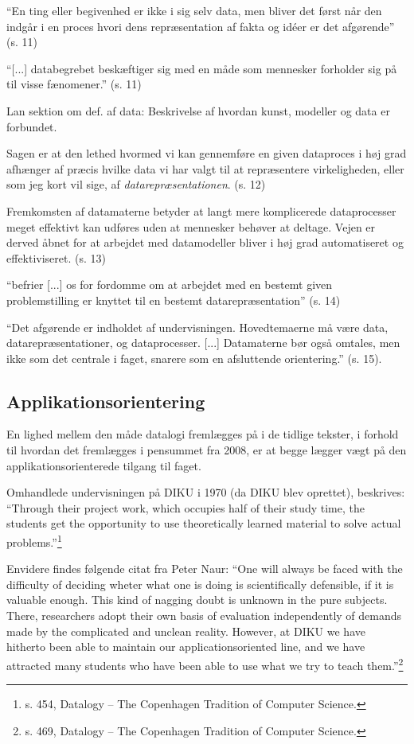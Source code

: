 \documentclass[10pt,a4paper]{article}
\begin{document}
``En ting eller begivenhed er ikke i sig selv data, men bliver det først når den
indgår i en proces hvori dens repræsentation af fakta og idéer er det afgørende''
(s. 11)

``[...] databegrebet beskæftiger sig med en måde som mennesker forholder 
sig på til visse fænomener.'' (s. 11)

Lan sektion om def. af data: Beskrivelse af hvordan kunst, modeller og data er
forbundet. 

Sagen er at den lethed hvormed vi kan gennemføre en given dataproces i høj grad 
afhænger af præcis hvilke data vi har valgt til at repræsentere virkeligheden, 
eller som jeg kort vil sige, af \emph{datarepræsentationen}. 
(s. 12)

Fremkomsten af datamaterne betyder at langt mere komplicerede dataprocesser 
meget effektivt kan udføres uden at mennesker behøver at deltage. Vejen er 
derved åbnet for at arbejdet med datamodeller bliver i høj grad automatiseret og 
effektiviseret. (s. 13)

``befrier [...] os for fordomme om at arbejdet med en bestemt given problemstilling
er knyttet til en bestemt datarepræsentation'' (s. 14)

``Det afgørende er indholdet af undervisningen. Hovedtemaerne må være data, 
datarepræsentationer, og dataprocesser. [...] Datamaterne bør også omtales, men
ikke som det centrale i faget, snarere som en afsluttende orientering.'' (s. 15). 


\subsection{Applikationsorientering}
En lighed mellem den måde datalogi fremlægges på i de tidlige tekster, i forhold til hvordan det fremlægges i pensummet fra 2008, er at begge lægger vægt på den applikationsorienterede tilgang til faget.

Omhandlede undervisningen på DIKU i 1970 (da DIKU blev oprettet), beskrives:
``Through their project work, which occupies half of their study time, the students get the opportunity to use theoretically learned material to solve actual problems.''\footnote{s. 454, Datalogy -- The Copenhagen Tradition of Computer Science.}

Envidere findes følgende citat fra Peter Naur:
``One will always be faced with the difficulty of deciding wheter what one is doing is scientifically defensible, if it is valuable enough. This kind of nagging doubt is unknown in the pure subjects. There, researchers adopt their own basis of evaluation independently of demands made by the complicated and unclean reality. However, at DIKU we have hitherto been able to maintain our applicationsoriented line, and we have attracted many students who have been able to use what we try to teach them.''\footnote{s. 469, Datalogy -- The Copenhagen Tradition of Computer Science.}
\end{document}
